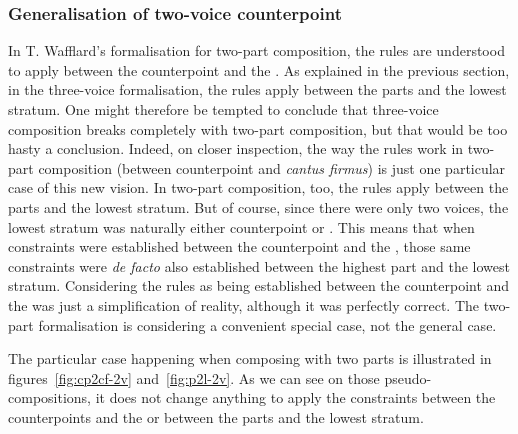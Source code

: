 \subsubsection{Generalisation of two-voice counterpoint}

In T. Wafflard's formalisation for two-part composition, the rules are understood to apply between the counterpoint and the \cf. As explained in the previous section, in the three-voice formalisation, the rules apply between the parts and the lowest stratum. One might therefore be tempted to conclude that three-voice composition breaks completely with two-part composition, but that would be too hasty a conclusion. Indeed, on closer inspection, the way the rules work in two-part composition (between counterpoint and \textit{cantus firmus}) is just one particular case of this new vision. In two-part composition, too, the rules apply between the parts and the lowest stratum. But of course, since there were only two voices, the lowest stratum was naturally either counterpoint or \cf. This means that when constraints were established between the counterpoint and the \cf, those same constraints were \textit{de facto} also established between the highest part and the lowest stratum. Considering the rules as being established between the counterpoint and the \cfs was just a simplification of reality, although it was perfectly correct. The two-part formalisation is considering a convenient special case, not the general case. 

The particular case happening when composing with two parts is illustrated in figures~\ref{fig:cp2cf-2v} and~\ref{fig:p2l-2v}. As we can see on those pseudo-compositions, it does not change anything to apply the constraints between the counterpoints and the \cfs or between the parts and the lowest stratum.

